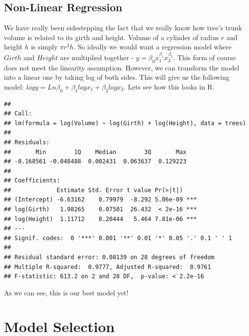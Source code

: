 \documentclass[11pt, letterpaper, twoside]{memoir}\usepackage{knitr}
\begin{document}
\subsection{Non-Linear Regression}

We have really been sidestepping the fact that we really know how tree's trunk volume is related to its girth and height. Volume of a cylinder of radius $r$ and height $h$ is simply $\pi r^2 h$. So ideally we would want a regression model where $Girth$ and $Height$ are multiplied together - $y = \beta_0 x_1^{\beta_1} x_2^{\beta_2}$. This form of course does not meet the linearity assumption. However, we can transform the model into a linear one by taking log of both sides. This will give us the following model: $log y = Ln \beta_0 + \beta_1 log x_1 + \beta_2 log x_2$. Lets see how this looks in R.

\begin{knitrout}
\color{fgcolor}\begin{kframe}
\begin{alltt}
 \hlkwb{<-} \hlstd{(} \hlopt{~}  \hlopt{+}   
\end{alltt}
\begin{verbatim}
## 
## Call:
## lm(formula = log(Volume) ~ log(Girth) + log(Height), data = trees)
## 
## Residuals:
##       Min        1Q    Median        3Q       Max 
## -0.168561 -0.048488  0.002431  0.063637  0.129223 
## 
## Coefficients:
##             Estimate Std. Error t value Pr(>|t|)    
## (Intercept) -6.63162    0.79979  -8.292 5.06e-09 ***
## log(Girth)   1.98265    0.07501  26.432  < 2e-16 ***
## log(Height)  1.11712    0.20444   5.464 7.81e-06 ***
## ---
## Signif. codes:  0 '***' 0.001 '**' 0.01 '*' 0.05 '.' 0.1 ' ' 1
## 
## Residual standard error: 0.08139 on 28 degrees of freedom
## Multiple R-squared:  0.9777,	Adjusted R-squared:  0.9761 
## F-statistic: 613.2 on 2 and 28 DF,  p-value: < 2.2e-16
\end{verbatim}
\end{kframe}
\end{knitrout}

As we can see, this is our best model yet!

\section{Model Selection}
\end{document}
